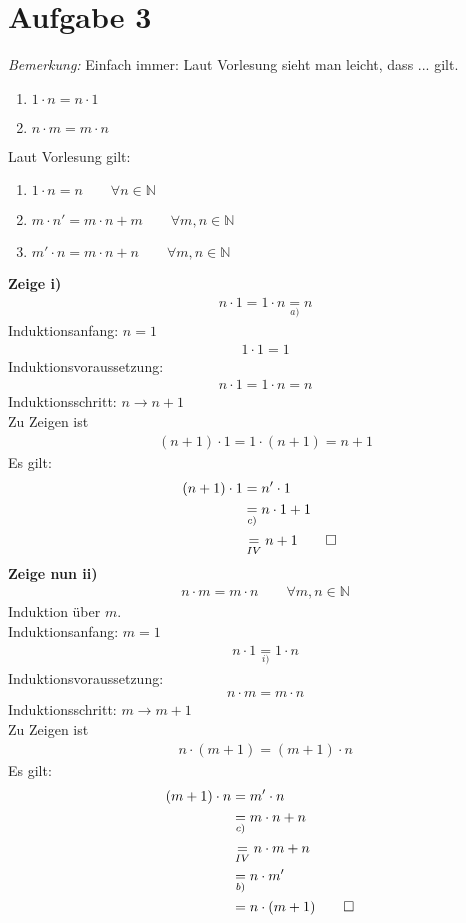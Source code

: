 \section{Aufgabe 3}
\textit{Bemerkung:} Einfach immer: Laut Vorlesung sieht man leicht, dass ... gilt.
\begin{enumerate}[label={\roman*)}]
  \item $1\cdot n = n\cdot 1$
  \item $n\cdot m =m\cdot n$
\end{enumerate}
Laut Vorlesung gilt:
\begin{enumerate}[label={\alph*)}]
  \item $1\cdot n=n \qquad \forall n\in\mathbb{N}$
  \item $m\cdot n'=m\cdot n+m \qquad \forall m,n\in\mathbb{N}$
  \item $m'\cdot n=m\cdot n+n \qquad \forall m,n\in\mathbb{N}$
\end{enumerate}
\textbf{Zeige i)}\begin{align*}&n\cdot 1=1\cdot n\underset{a)}{=}n\end{align*}
Induktionsanfang: $n=1$ \begin{align*}&1\cdot 1=1\end{align*}
Induktionsvoraussetzung: \begin{align*}&n\cdot 1=1\cdot n=n\end{align*}
Induktionsschritt: $n\rightarrow n+1$ \\
Zu Zeigen ist \begin{align*}&(n+1)\cdot 1=1\cdot (n+1)=n+1\end{align*}
Es gilt: \begin{align*}(n+1)\cdot 1&=n'\cdot 1\\ &\underset{c)}{=}n\cdot 1+1\\ &\underset{IV}{=}n+1\qed\end{align*}
\textbf{Zeige nun ii)}\begin{align*}&n\cdot m=m\cdot n\qquad\forall m,n\in\mathbb{N}\end{align*}
Induktion über $m$.\\
Induktionsanfang: $m=1$ \begin{align*}&n\cdot 1\underset{i)}{=}1\cdot n\end{align*}
Induktionsvoraussetzung: \begin{align*}&n\cdot m=m\cdot n\end{align*}
Induktionsschritt: $m\rightarrow m+1$ \\
Zu Zeigen ist \begin{align*}&n\cdot (m+1)=(m+1)\cdot n\end{align*}
Es gilt: \begin{align*}(m+1)\cdot n&=m'\cdot n\\ &\underset{c)}{=}m\cdot n+n\\ &\underset{IV}{=}n\cdot m+n\\ &\underset{b)}{=}n\cdot m'\\ &=n\cdot (m+1)\qed\end{align*}

